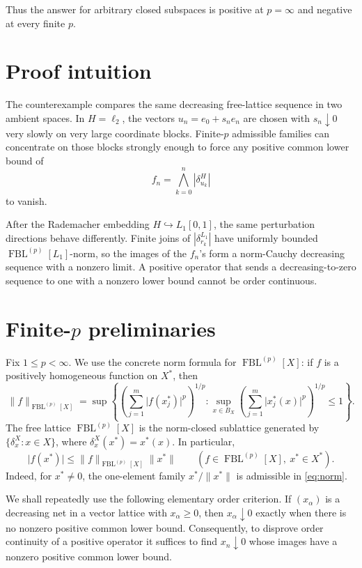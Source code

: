 \documentclass[11pt]{article}
\theoremstyle{remark}
\newcommand{\FBL}[2]{\operatorname{FBL}^{(#1)}[#2]}
\newcommand{\abs}[1]{\lvert #1\rvert}
\newcommand{\norm}[1]{\lVert #1\rVert}
\begin{document}
Thus the answer for arbitrary closed subspaces is positive at
\(p=\infty\) and negative at every finite \(p\).

\section{Proof intuition}

The counterexample compares the same decreasing free-lattice sequence in two
ambient spaces.  In \(H=\ell_2\), the vectors
\(u_n=e_0+s_ne_n\) are chosen with \(s_n\downarrow0\) very slowly on very
large coordinate blocks.  Finite-\(p\) admissible families can concentrate on
those blocks strongly enough to force any positive common lower bound of
\[
  f_n=\bigwedge_{k=0}^n |\delta_{u_k}^H|
\]
to vanish.

After the Rademacher embedding \(H\hookrightarrow L_1[0,1]\), the same
perturbation directions behave differently.  Finite joins of
\(|\delta_{r_k}^{L_1}|\) have uniformly bounded \(\FBL{p}{L_1}\)-norm, so the
images of the \(f_n\)'s form a norm-Cauchy decreasing sequence with a nonzero
limit.  A positive operator that sends a decreasing-to-zero sequence to one
with a nonzero lower bound cannot be order continuous.

\section{Finite-\texorpdfstring{\(p\)}{p} preliminaries}

Fix \(1\le p<\infty\).  We use the concrete norm formula for
\(\FBL{p}{X}\): if \(f\) is a positively homogeneous function on \(X^*\),
then
\begin{equation}\label{eq:norm}
 \norm{f}_{\FBL{p}{X}}
 =\sup\left\{
   \left(\sum_{j=1}^m \abs{f(x_j^*)}^p\right)^{1/p}:
   \sup_{x\in B_X}
   \left(\sum_{j=1}^m\abs{x_j^*(x)}^p\right)^{1/p}\le1
 \right\}.
\end{equation}
The free lattice \(\FBL{p}{X}\) is the norm-closed sublattice generated by
\(\{\delta_x^X:x\in X\}\), where
\(\delta_x^X(x^*)=x^*(x)\).  In particular,
\begin{equation}\label{eq:evaluation}
  \abs{f(x^*)}\le \norm{f}_{\FBL{p}{X}}\norm{x^*}
  \qquad(f\in\FBL{p}{X},\ x^*\in X^*).
\end{equation}
Indeed, for \(x^*\ne0\), the one-element family
\(x^*/\norm{x^*}\) is admissible in \eqref{eq:norm}.

We shall repeatedly use the following elementary order criterion.  If
\((x_\alpha)\) is a decreasing net in a vector lattice with \(x_\alpha\ge0\),
then \(x_\alpha\downarrow0\) exactly when there is no nonzero positive
common lower bound.  Consequently, to disprove order continuity of a positive
operator it suffices to find \(x_n\downarrow0\) whose images have a nonzero
positive common lower bound.
\end{document}

